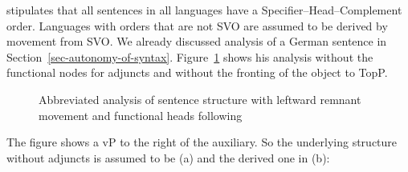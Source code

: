 \largerpage
\citet{Kayne94a-u} stipulates that all sentences in all languages have a Specifier–Head–Complement
order. Languages with orders that are not SVO are assumed to be derived by movement from SVO. We
already discussed  analysis of a German sentence in
Section~\ref{sec-autonomy-of-syntax}. Figure~\ref{fig-Kayne-for-German} shows his analysis without
the functional nodes for adjuncts and without the fronting of the object to TopP.


\begin{figure}
\scalebox{.93}{%
\begin{forest}
sm edges
[CP
	[C$^0$[weil;because, tier=word]]
		[SubjP
			[DP$_i$ [der Mann;the man,roof]]
				[ObjP
					[DP$_j$ [diese Sonate;this sonata,roof]]
								[AuxP
									[VP$_k$ [gespielt;played,tier=word]]
									[Aux+
										[Aux [hat;has,tier=word]]
										[vP
											[DP$_i$ [,phantom]]
											[VP$_k$
												[V [,phantom]]
												[DP$_j$
                                                                                                  [,phantom]]]]]]]]]
\end{forest}%
}
\caption{\label{fig-Kayne-for-German}Abbreviated analysis of sentence structure with leftward remnant movement
  and functional heads following \citet[]{Laenzlinger2004a}}
\end{figure}%

The figure shows a vP to the right of the auxiliary. So the underlying structure without adjuncts is assumed to be
(a) and the derived one in (b):
\eal
{}
\zl

